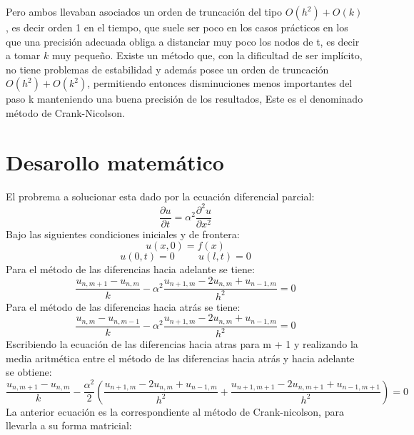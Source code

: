 \documentclass[11pt]{article} %
\begin{document}
Pero ambos llevaban asociados un orden de truncación del tipo $O(h^2) + O(k)$, es decir orden 1 en el tiempo, que suele ser poco en los casos prácticos en los que una precisión adecuada obliga a distanciar muy poco los nodos de t, es decir a tomar $k$ muy pequeño. Existe un método que, con la dificultad de ser implícito, no tiene problemas de estabilidad y además posee un orden de truncación $O(h^2) + O(k^2)$, permitiendo entonces disminuciones menos importantes del paso k manteniendo una buena precisión de los resultados, Este es el denominado método de Crank-Nicolson.


\section*{Desarollo matemático}

El probrema a solucionar esta dado por la ecuación diferencial parcial:
$$\frac{\partial u}{\partial t}=\alpha^2\frac{\partial^2 u}{\partial x^2}$$
Bajo las siguientes condiciones iniciales y de frontera:
$$u(x,0)=f(x)$$
$$u(0,t)=0\hspace{1cm}u(l,t)=0$$
Para el método de las diferencias hacia adelante se tiene:
$$\frac{u_{n,m+1}-u_{n,m}}{k}-\alpha^2\frac{u_{n+1,m}-2u_{n,m}+u_{n-1,m}}{h^2}=0$$
Para el método de las diferencias hacia atrás se tiene: 
$$\frac{u_{n,m}-u_{n,m-1}}{k}-\alpha^2\frac{u_{n+1,m}-2u_{n,m}+u_{n-1,m}}{h^2}=0$$
Escribiendo la ecuación de las diferencias hacia atras para m + 1 y realizando la media aritmética entre el método de las diferencias hacia atrás y hacia adelante se obtiene: 
$$\frac{u_{n,m+1}-u_{n,m}}{k}-\frac{\alpha^2}{2}(\frac{u_{n+1,m}-2u_{n,m}+u_{n-1,m}}{h^2}+\frac{u_{n+1,m+1}-2u_{n,m+1}+u_{n-1,m+1}}{h^2})=0$$
La anterior ecuación es la correspondiente al método de Crank-nicolson, para llevarla a su forma matricial:
\end{document}
